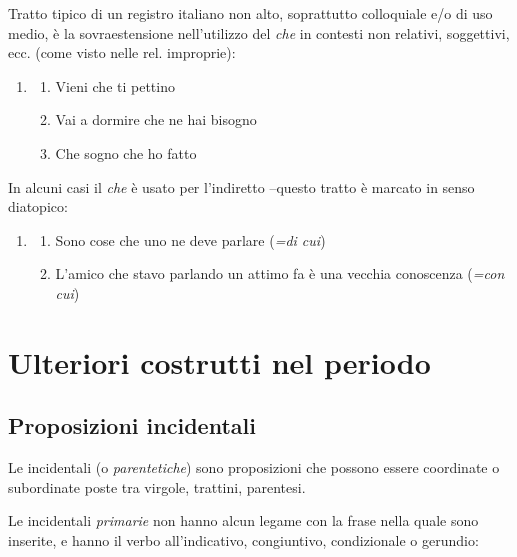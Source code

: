 \documentclass[
  a4paper,
  twoside,
  11pt,
  chapterprefix=false,
  bibliography=totocnumbered,
  listof=flat]{scrbook}
\providecommand{\tightlist}{%
  \setlength{\itemsep}{0pt}\setlength{\parskip}{0pt}}
\begin{document}
Tratto tipico di un registro italiano non alto, soprattutto colloquiale e/o di uso medio, è la sovraestensione nell'utilizzo del \emph{che} in contesti non relativi, soggettivi, ecc. (come visto nelle rel. improprie):

\begin{enumerate}
\def\labelenumi{(\arabic{enumi})}
\setcounter{enumi}{146}
\item
  \begin{enumerate}
  \def\labelenumii{\alph{enumii}.}
  \tightlist
  \item
    Vieni che ti pettino
  \item
    Vai a dormire che ne hai bisogno
  \item
    Che sogno che ho fatto
  \end{enumerate}
\end{enumerate}

In alcuni casi il \emph{che} è usato per l'indiretto --questo tratto è marcato in senso diatopico:

\begin{enumerate}
\def\labelenumi{(\arabic{enumi})}
\setcounter{enumi}{147}
\item
  \begin{enumerate}
  \def\labelenumii{\alph{enumii}.}
  \tightlist
  \item
    Sono cose che uno ne deve parlare (\emph{=di cui})
  \item
    L'amico che stavo parlando un attimo fa è una vecchia conoscenza (\emph{=con cui})
  \end{enumerate}
\end{enumerate}

\hypertarget{ulteriori-costrutti-nel-periodo}{%
\chapter{Ulteriori costrutti nel periodo}\label{ulteriori-costrutti-nel-periodo}}

\hypertarget{proposizioni-incidentali}{%
\section{Proposizioni incidentali}\label{proposizioni-incidentali}}

Le incidentali (o \emph{parentetiche}) sono proposizioni che possono essere coordinate o subordinate poste tra virgole, trattini, parentesi.

Le incidentali \emph{primarie} non hanno alcun legame con la frase nella quale sono inserite, e hanno il verbo all'indicativo, congiuntivo, condizionale o gerundio:
\end{document}
